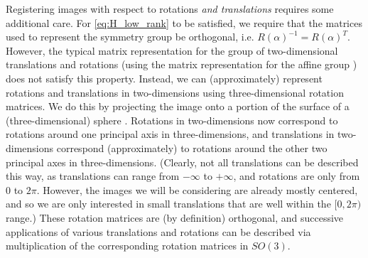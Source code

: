 \documentclass{pnastwo}
\begin{document}
\begin{article}
\begin{materials}
Registering images with respect to rotations {\em and translations} requires some additional care.
%
%
For \eqref{eq:H_low_rank} to be satisfied, we require that the matrices used to represent the symmetry group be orthogonal, i.e. $R(\alpha)^{-1} = R(\alpha)^T$. 
%
However, the typical matrix representation for the group of two-dimensional translations and rotations (using the matrix representation for the affine group \cite{...}) does not satisfy this property. 
%
Instead, we can (approximately) represent rotations and translations in two-dimensions using three-dimensional rotation matrices.
%
We do this by projecting the image onto a portion of the surface of a (three-dimensional) sphere \cite{singer2011angular}. %
%
Rotations in two-dimensions now correspond to rotations around one principal axis in three-dimensions, and translations in two-dimensions correspond (approximately) to rotations around the other two principal axes in three-dimensions. (Clearly, not all translations can be described this way, as translations can range from $-\infty$ to $+ \infty$, and rotations are only from $0$ to $2 \pi$. However, the images we will be considering are already mostly centered, and so we are only interested in small translations that are well within the $[0, 2\pi)$ range.)
%
These rotation matrices are (by definition) orthogonal, and successive applications of various translations and rotations can be described via multiplication of the corresponding rotation matrices in $SO(3)$.


\end{materials}
\end{article}
\end{document}
